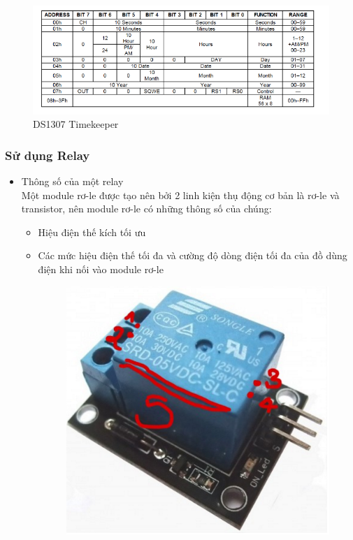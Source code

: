 \documentclass[a4paper,12pt,oneside]{article}
\begin{document}
\begin{itemize}
\begin{itemize}
\begin{figure}[H]
\begin{center}
\includegraphics[scale=0.8]{hinh/timekeeper.png}
\end{center}
\caption{DS1307 Timekeeper}
\end{figure}
\end{itemize}

\subsubsection{Sử dụng Relay}
\begin{itemize}
\item Thông số của một relay\\
Một module rơ-le được tạo nên bởi 2 linh kiện thụ động cơ bản là rơ-le và transistor, nên module rơ-le có những thông số của chúng:
\begin{itemize}%
\item Hiệu điện thế kích tối ưu
\item Các mức hiệu điện thế tối đa và cường độ dòng điện tối đa của đồ dùng điện khi nối vào module rơ-le
\begin{figure}[H]
\begin{center}
\includegraphics[scale=0.8]{hinh/relay.png}

\end{center}
\end{figure}
\end{itemize}
\end{itemize}
\end{itemize}
\end{document}
